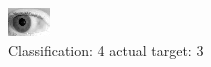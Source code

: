 \begin{figure}[h!]
\begin{center}
\includegraphics[width=0.60\columnwidth]{figures/ID249_class_4_target_3.png}
\end{center}
\caption{ Classification: 4 actual target: 3}
\label{fig:ID249_class_4_target_3}
\end{figure}
